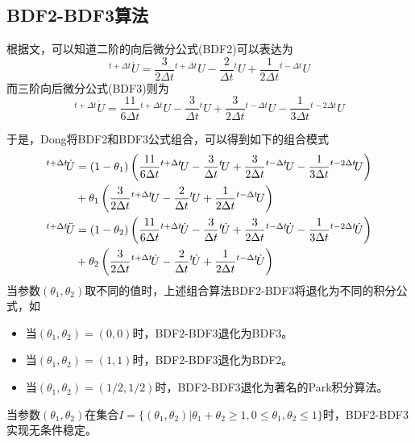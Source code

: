 \subsection{BDF2-BDF3算法}
根据文，可以知道二阶的向后微分公式(BDF2)可以表达为
\begin{equation}
{^{t+\Delta t}\!\dot{U}}=\frac{3}{2\Delta t}{^{t+\Delta t}\!U}-\frac{2}{\Delta t}{^{t}\!U}+\frac{1}{2\Delta t}{^{t-\Delta t}\!U}
\end{equation}
而三阶向后微分公式(BDF3)则为
\begin{equation}
{^{t+\Delta t}\!\dot{U}}=\frac{11}{6\Delta t}{^{t+\Delta t}\!U}-\frac{3}{\Delta t}{^{t}\!U}+\frac{3}{2\Delta t}{^{t-\Delta t}\!U}-\frac{1}{3\Delta t}{^{t-2\Delta t}\!U}
\end{equation}

于是，Dong将BDF2和BDF3公式组合，可以得到如下的组合模式\cite{Dong2013}
\begin{align}
{^{t+\Delta t}\!\dot{U}}&=(1-\theta_1)\left(\frac{11}{6\Delta t}{^{t+\Delta t}\!U}-\frac{3}{\Delta t}{^{t}\!U}+\frac{3}{2\Delta t}{^{t-\Delta t}\!U}-\frac{1}{3\Delta t}{^{t-2\Delta t}\!U} \right)\notag\\
&+\theta_1\left(\frac{3}{2\Delta t}{^{t+\Delta t}\!U}-\frac{2}{\Delta t}{^{t}\!U}+\frac{1}{2\Delta t}{^{t-\Delta t}\!U} \right)\\
{^{t+\Delta t}\!\ddot{U}}&=(1-\theta_2)\left(\frac{11}{6\Delta t}{^{t+\Delta t}\!\dot{U}}-\frac{3}{\Delta t}{^{t}\!\dot{U}}+\frac{3}{2\Delta t}{^{t-\Delta t}\!\dot{U}}-\frac{1}{3\Delta t}{^{t-2\Delta t}\!\dot{U}} \right)\notag\\
&+\theta_2\left(\frac{3}{2\Delta t}{^{t+\Delta t}\!\dot{U}}-\frac{2}{\Delta t}{^{t}\!\dot{U}}+\frac{1}{2\Delta t}{^{t-\Delta t}\!\dot{U}}\right)
\end{align}
当参数$(\theta_1,\theta_2)$取不同的值时，上述组合算法BDF2-BDF3将退化为不同的积分公式，如
\begin{itemize}
\item 当$(\theta_1,\theta_2)=(0,0)$时，BDF2-BDF3退化为BDF3。
\item 当$(\theta_1,\theta_2)=(1,1)$时，BDF2-BDF3退化为BDF2。
\item 当$(\theta_1,\theta_2)=(1/2,1/2)$时，BDF2-BDF3退化为著名的Park积分算法\cite{Park1975}。
\end{itemize}
当参数$(\theta_1,\theta_2)$在集合$I=\{(\theta_1,\theta_2)|\theta_1+\theta_2\ge1,0\le\theta_1,\theta_2\le1\}$时，BDF2-BDF3实现无条件稳定\cite{Dong2013}。

